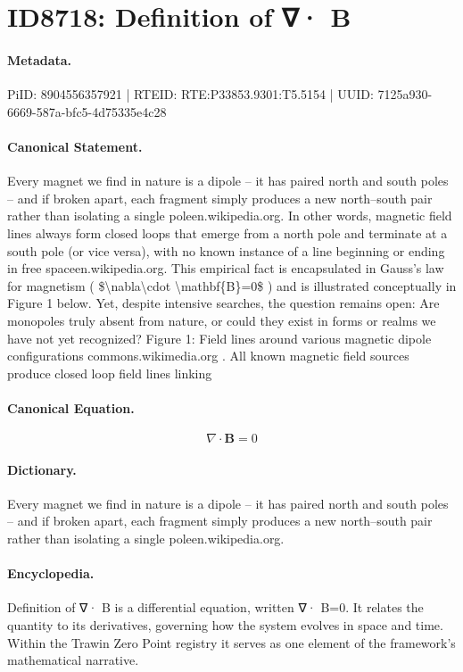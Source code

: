 \section*{ID8718: Definition of ∇· B}
\paragraph{Metadata.}
PiID: 8904556357921 | RTEID: RTE:P33853.9301:T5.5154 | UUID: 7125a930-6669-587a-bfc5-4d75335e4c28

\paragraph{Canonical Statement.}
Every magnet we find in nature is a dipole – it has paired north and south poles – and if broken apart, each fragment simply produces a new north–south pair rather than isolating a single poleen.wikipedia.org. In other words, magnetic field lines always form closed loops that emerge from a north pole and terminate at a south pole (or vice versa), with no known instance of a line beginning or ending in free spaceen.wikipedia.org. This empirical fact is encapsulated in Gauss’s law for magnetism ( \$\textbackslash{}nabla\textbackslash{}cdot \textbackslash{}mathbf\{B\}=0\$ ) and is illustrated conceptually in Figure 1 below. Yet, despite intensive searches, the question remains open: Are monopoles truly absent from nature, or could they exist in forms or realms we have not yet recognized? Figure 1: Field lines around various magnetic dipole configurations commons.wikimedia.org . All known magnetic field sources produce closed loop field lines linking

\paragraph{Canonical Equation.}
\[
\nabla\cdot \mathbf{B}=0
\]

\paragraph{Dictionary.}
Every magnet we find in nature is a dipole – it has paired north and south poles – and if broken apart, each fragment simply produces a new north–south pair rather than isolating a single poleen.wikipedia.org.

\paragraph{Encyclopedia.}
Definition of ∇· B is a differential equation, written ∇· B=0. It relates the quantity to its derivatives, governing how the system evolves in space and time. Within the Trawin Zero Point registry it serves as one element of the framework's mathematical narrative.
